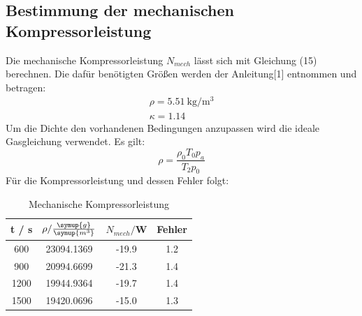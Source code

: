 \subsection{Bestimmung der mechanischen Kompressorleistung}
Die mechanische Kompressorleistung $N_{mech}$ lässt sich mit Gleichung (15) berechnen. Die dafür
benötigten Größen werden der Anleitung[1] entnommen und betragen:
\begin{align}
  \rho = \SI{5.51}{\kilo\gram\per\cubic\meter} \\
  \kappa = 1.14
\end{align}
Um die Dichte den vorhandenen Bedingungen anzupassen wird die ideale Gasgleichung
verwendet. Es gilt:
\begin{equation}
  \rho = \frac{\rho_0 T_0 p_a}{T_2 p_0}
\end{equation}
Für die Kompressorleistung und dessen Fehler folgt:
\begin{table}
  \centering
  \caption{Mechanische Kompressorleistung}
  \label{tab:Mechanische Kompressorleistung}
  \begin{tabular}{c c c c}
    \toprule
    t / s  &$\rho/\frac{\symup{g}}{\symup{m^3}}$ & $N_{mech}/$W & Fehler \\
    \midrule
     600 & 23094.1369 & -19.9 & 1.2 \\
     900 & 20994.6699 & -21.3 & 1.4 \\
    1200 & 19944.9364 & -19.7 & 1.4 \\
    1500 & 19420.0696 & -15.0 & 1.3 \\
    \bottomrule
  \end{tabular}
\end{table}
